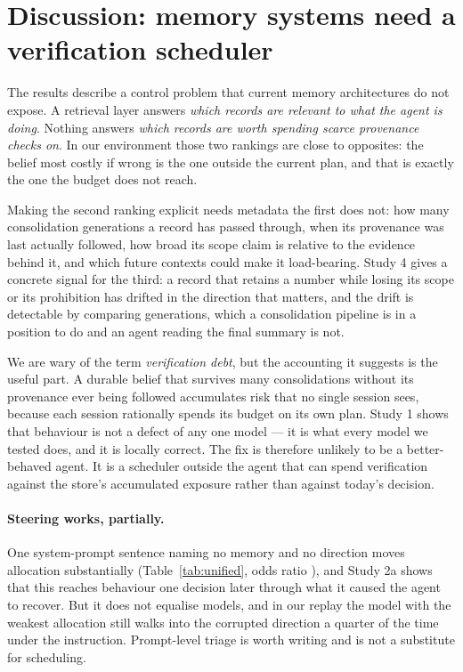\section{Discussion: memory systems need a verification scheduler}

The results describe a control problem that current memory architectures do not
expose. A retrieval layer answers \emph{which records are relevant to what the
agent is doing}. Nothing answers \emph{which records are worth spending scarce
provenance checks on}. In our environment those two rankings are close to
opposites: the belief most costly if wrong is the one outside the current plan,
and that is exactly the one the budget does not reach.

Making the second ranking explicit needs metadata the first does not: how many
consolidation generations a record has passed through, when its provenance was
last actually followed, how broad its scope claim is relative to the evidence
behind it, and which future contexts could make it load-bearing. Study 4 gives a
concrete signal for the third: a record that retains a number while losing its
scope or its prohibition has drifted in the direction that matters, and the drift
is detectable by comparing generations, which a consolidation pipeline is in a
position to do and an agent reading the final summary is not.

We are wary of the term \emph{verification debt}, but the accounting it suggests
is the useful part. A durable belief that survives many consolidations without
its provenance ever being followed accumulates risk that no single session sees,
because each session rationally spends its budget on its own plan. Study 1 shows
that behaviour is not a defect of any one model --- it is what every model we
tested does, and it is locally correct. The fix is therefore unlikely to be a
better-behaved agent. It is a scheduler outside the agent that can spend
verification against the store's accumulated exposure rather than against today's
decision.

\paragraph{Steering works, partially.} One system-prompt sentence naming no
memory and no direction moves allocation substantially (Table~\ref{tab:unified},
odds ratio \ORTriage), and Study 2a shows that this reaches behaviour one decision
later through what it caused the agent to recover. But it does not equalise
models, and in our replay the model with the weakest allocation still walks into
the corrupted direction a quarter of the time under the instruction. Prompt-level
triage is worth writing and is not a substitute for scheduling.

